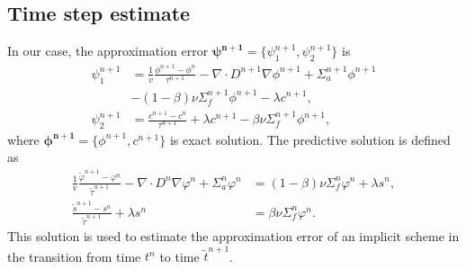 \documentclass[runningheads]{llncs}
\begin{document}
\subsection{Time step estimate}
In our case, the approximation error $\bm{\psi^{n+1}} = \{\psi^{n+1}_1, \psi^{n+1}_2\}$ is
\begin{equation}\label{14}
\begin{split}
\psi^{n+1}_1  & =  \frac{1}{v} \frac{\phi^{n+1}-\phi^n}{\tau^{n+1}} - \nabla \cdot D^{n+1} \nabla \phi^{n+1} + \Sigma_{a}^{n+1} \phi^{n+1} \\
 & - (1-\beta) \nu \Sigma^{n+1}_{f} \phi^{n+1} - \lambda  c^{n+1}, \\
\psi^{n+1}_2  & =  \frac{ c^{n+1}-c^n}{\tau^{n+1}} + \lambda c^{n+1} - \beta \nu\Sigma_{f}^{n+1} \phi^{n+1},
\end{split}
\end{equation} 
where $\bm{\phi^{n+1}} = \{ \phi^{n+1}, c^{n+1} \}$ is exact solution.
The predictive solution is defined as
\begin{equation}\label{15}
\begin{split}
\frac{1}{v} \frac{\widetilde\varphi^{n+1}-\varphi^n}{\widetilde\tau^{n+1}} - \nabla \cdot D^n \nabla \varphi^n + \Sigma^n_{a} \varphi^n & = (1-\beta) \nu \Sigma^n_{f} \varphi^n + \lambda s^n, \\
\frac{\widetilde s^{n+1}-s^n}{\widetilde\tau^{n+1}} + \lambda s^n &= \beta \nu\Sigma^n_{f} \varphi^n.
\end{split}
\end{equation} 
This solution is used to estimate the approximation error of an implicit scheme in the transition from time $t^n$ to time $\widetilde{t}^{n+1}$.
\end{document}
